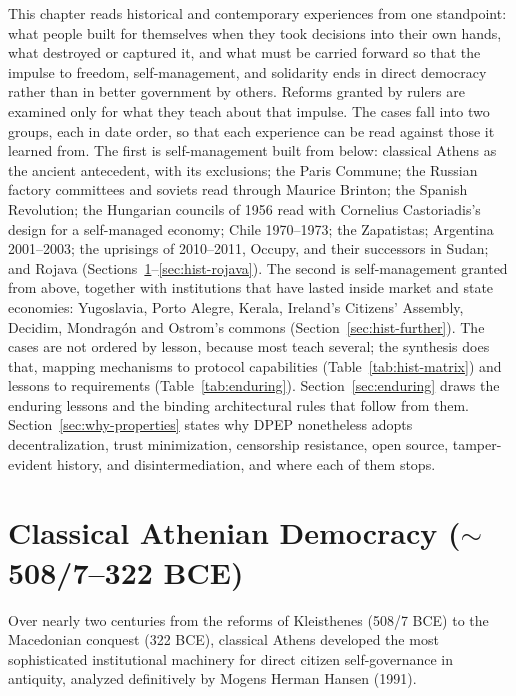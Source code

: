 \documentclass[10pt,twoside,openany]{book}
\theoremstyle{dpepstyle}
\begin{document}
This chapter reads historical and contemporary experiences from one standpoint: what people built for themselves when they took decisions into their own hands, what destroyed or captured it, and what must be carried forward so that the impulse to freedom, self-management, and solidarity ends in direct democracy rather than in better government by others. Reforms granted by rulers are examined only for what they teach about that impulse. The cases fall into two groups, each in date order, so that each experience can be read against those it learned from. The first is self-management built from below: classical Athens as the ancient antecedent, with its exclusions; the Paris Commune; the Russian factory committees and soviets read through Maurice Brinton; the Spanish Revolution; the Hungarian councils of 1956 read with Cornelius Castoriadis's design for a self-managed economy; Chile 1970--1973; the Zapatistas; Argentina 2001--2003; the uprisings of 2010--2011, Occupy, and their successors in Sudan; and Rojava (Sections~\ref{sec:hist-athens}--\ref{sec:hist-rojava}). The second is self-management granted from above, together with institutions that have lasted inside market and state economies: Yugoslavia, Porto Alegre, Kerala, Ireland's Citizens' Assembly, Decidim, Mondrag\'on and Ostrom's commons (Section~\ref{sec:hist-further}). The cases are not ordered by lesson, because most teach several; the synthesis does that, mapping mechanisms to protocol capabilities (Table~\ref{tab:hist-matrix}) and lessons to requirements (Table~\ref{tab:enduring}). Section~\ref{sec:enduring} draws the enduring lessons and the binding architectural rules that follow from them. Section~\ref{sec:why-properties} states why DPEP nonetheless adopts decentralization, trust minimization, censorship resistance, open source, tamper-evident history, and disintermediation, and where each of them stops.

\section{Classical Athenian Democracy ($\sim$508/7--322 BCE)}
\label{sec:hist-athens}

Over nearly two centuries from the reforms of Kleisthenes (508/7 BCE) to the Macedonian conquest (322 BCE), classical Athens developed the most sophisticated institutional machinery for direct citizen self-governance in antiquity, analyzed definitively by Mogens Herman Hansen (1991).
\end{document}

